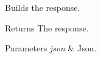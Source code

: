 Builds the response. 

\begin{DoxyReturn}{Returns}
The response.
\end{DoxyReturn}

\begin{DoxyParams}{Parameters}
{\em json} & Json.\\
\hline
\end{DoxyParams}
